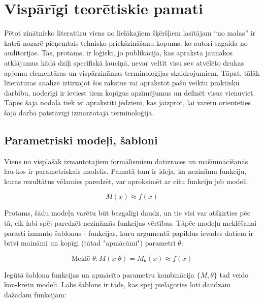 \documentclass[12pt, a4paper]{article}
\numberwithin{equation}{section} %
\begin{document}
%
%
%
%
%
%
%
%
%
%
%
%
%
%
%
%
%
%
%

\newpage
\section{Vispārīgi teorētiskie pamati}

Pētot zinātnisko literatūru viens no lielākajiem šķēršļiem lasītājam ``no malas'' ir katrā nozarē pieņemtais tehnisko priekšzināšanu kopums, ko autori sagaida no auditorijas. Tas, protams, ir loģiski, jo publikācija, kas apraksta jaunākos atklājumus kādā dziļi specifiskā lauciņā, nevar veltīt visu sev atvēlēto drukas apjomu elementāras un vispārzināmas terminoloģijas skaidrojumiem. Tāpat, tālāk literatūras analīzē iztirzājot šos rakstus vai aprakstot pašu veiktu praktisku darbību, noderīgi ir ieviest tiem kopīgus apzīmējumus un definēt visus vienuviet. Tāpēc šajā nodaļā tiek īsi aprakstīti jēdzieni, kas jāizprot, lai varētu orientēties šajā darbā patstāvīgi izmantotajā terminoloģijā.

\subsection{Parametriski modeļi, šabloni}

Viens no visplašāk izmantotajiem formālismiem datizraces un mašīnmācīšanās lau-kos ir parametriskais modelis. Pamatā tam ir ideja, ka nezināmu funkciju, kuras rezultātus vēlamies paredzēt, var aproksimēt ar citu funkciju jeb modeli:

\begin{equation} 
    M(x) \approx f(x)
\end{equation}

Protams, šādu modeļu varētu būt bezgalīgi daudz, un tie visi var atšķirties pēc tā, cik labi spēj paredzēt nezināmās funkcijas vērtības. Tāpēc modeļu meklēšanai parasti izmanto šablonus - funkcijas, kuru argumentā papildus ievades datiem ir brīvi maināmi un kopīgi (tātad "apmācāmi") parametri $\theta$:

\begin{equation} 
    \text{Meklē } \theta:M(x \vert \theta) = M_{\theta}(x)  \approx f(x)
\end{equation}

Iegūtā šablona funkcijas un apmācīto parametru kombinācija $\lbrace M, \theta \rbrace$ tad veido kon-krētu modeli. Labs šablons ir tāds, kas spēj pielāgoties ļoti daudzām dažādām funkcijām:
\end{document}
